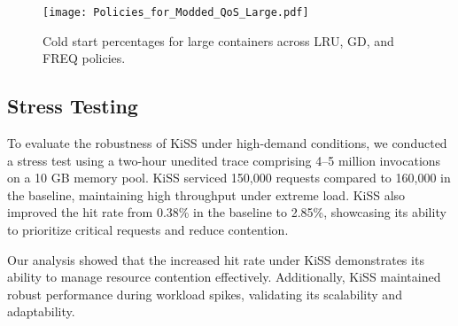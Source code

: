\begin{figure}[h]
    \centering
    \texttt{[image: Policies\_for\_Modded\_QoS\_Large.pdf]}
    \caption{Cold start percentages for large containers across LRU, GD, and FREQ policies.}
    \label{fig:policy_fairness_large}
\end{figure}


\subsection{Stress Testing}
To evaluate the robustness of KiSS under high-demand conditions, we conducted a stress test using a two-hour unedited trace comprising 4--5 million invocations on a 10 GB memory pool.  
KiSS serviced 150,000 requests compared to 160,000 in the baseline, maintaining high throughput under extreme load. KiSS also improved the hit rate from 0.38\% in the baseline to 2.85\%, showcasing its ability to prioritize critical requests and reduce contention.

Our analysis showed that the increased hit rate under KiSS demonstrates its ability to manage resource contention effectively. Additionally, KiSS maintained robust performance during workload spikes, validating its scalability and adaptability.

